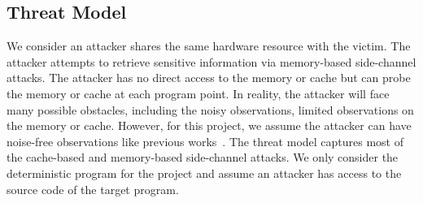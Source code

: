 \subsection{Threat Model}
We consider an attacker shares the same hardware resource with the victim.
The attacker attempts to retrieve sensitive information via memory-based
side-channel attacks. The attacker has no direct access to the memory or cache
but can probe the memory or cache at each program point. In reality, the
attacker will face many possible obstacles, including the noisy observations,
limited observations on the memory or cache. However, for this project, we assume
the attacker can have noise-free observations like previous works~\cite{203878,182946,Brotzman19Casym}. 
The threat model captures most of the cache-based and memory-based side-channel attacks. 
We only consider the deterministic program for the project and assume an attacker 
has access to the source code of the target program.
